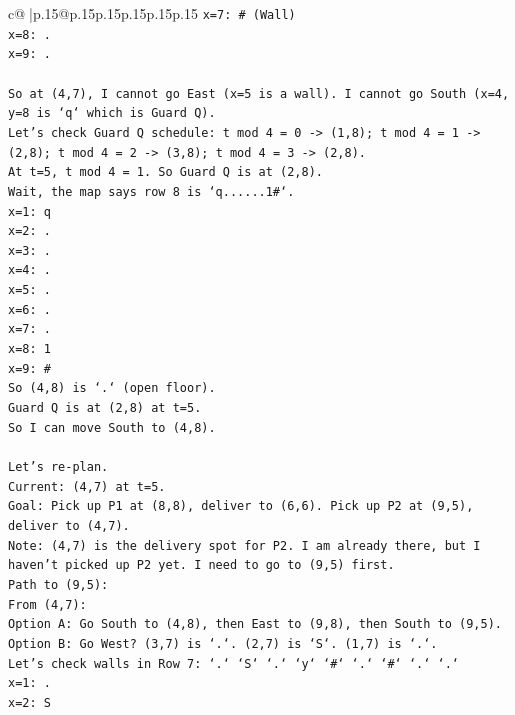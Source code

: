 \documentclass{article}
\begin{document}
{\begin{supertabular}{c@{$\;$}|p{.15\linewidth}@{}p{.15\linewidth}p{.15\linewidth}p{.15\linewidth}p{.15\linewidth}p{.15\linewidth}}
{{{\texttt{x=7: \# (Wall)} \\
\texttt{x=8: .} \\
\texttt{x=9: .} \\
\\ 
\texttt{So at (4,7), I cannot go East (x=5 is a wall). I cannot go South (x=4, y=8 is `q` which is Guard Q).} \\
\texttt{Let's check Guard Q schedule: t mod 4 = 0 {-}> (1,8); t mod 4 = 1 {-}> (2,8); t mod 4 = 2 {-}> (3,8); t mod 4 = 3 {-}> (2,8).} \\
\texttt{At t=5, t mod 4 = 1. So Guard Q is at (2,8).} \\
\texttt{Wait, the map says row 8 is `q......1\#`.} \\
\texttt{x=1: q} \\
\texttt{x=2: .} \\
\texttt{x=3: .} \\
\texttt{x=4: .} \\
\texttt{x=5: .} \\
\texttt{x=6: .} \\
\texttt{x=7: .} \\
\texttt{x=8: 1} \\
\texttt{x=9: \#} \\
\texttt{So (4,8) is `.` (open floor).} \\
\texttt{Guard Q is at (2,8) at t=5.} \\
\texttt{So I can move South to (4,8).} \\
\\ 
\texttt{Let's re{-}plan.} \\
\texttt{Current: (4,7) at t=5.} \\
\texttt{Goal: Pick up P1 at (8,8), deliver to (6,6). Pick up P2 at (9,5), deliver to (4,7).} \\
\texttt{Note: (4,7) is the delivery spot for P2. I am already there, but I haven't picked up P2 yet. I need to go to (9,5) first.} \\
\texttt{Path to (9,5):} \\
\texttt{From (4,7):} \\
\texttt{Option A: Go South to (4,8), then East to (9,8), then South to (9,5).} \\
\texttt{Option B: Go West? (3,7) is `.`. (2,7) is `S`. (1,7) is `.`.} \\
\texttt{Let's check walls in Row 7: `.` `S` `.` `y` `\#` `.` `\#` `.` `.`} \\
\texttt{x=1: .} \\
\texttt{x=2: S} \\
}}}
\end{supertabular}}
\end{document}

